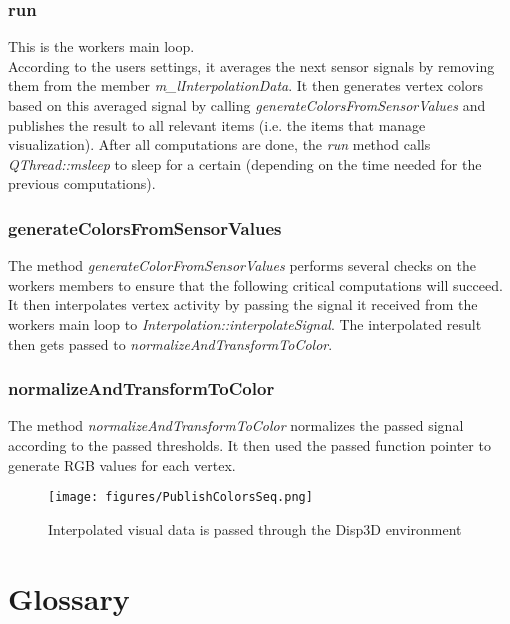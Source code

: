 \subsubsection{run}

This is the workers main loop.\\
According to the users settings, it averages the next sensor signals by removing them from the member \textit{m\_lInterpolationData}. It then generates vertex colors based on this averaged signal by calling \textit{generateColorsFromSensorValues} and publishes the result to all relevant items (i.e. the items that manage visualization). After all computations are done, the \textit{run} method calls \textit{QThread::msleep} to sleep for a certain (depending on the time needed for the previous computations).

\subsubsection{generateColorsFromSensorValues}

The method \textit{generateColorFromSensorValues} performs several checks on the workers members to ensure that the following critical computations will succeed. It then interpolates vertex activity by passing the signal it received from the workers main loop to \textit{Interpolation::interpolateSignal}. The interpolated result then gets passed to \textit{normalizeAndTransformToColor}.

\subsubsection{normalizeAndTransformToColor}

The method \textit{normalizeAndTransformToColor} normalizes the passed signal according to the passed thresholds. It then used the passed function pointer to generate RGB values for each vertex.

\begin{figure}[h]
	\begin{center}
		\texttt{[image: figures/PublishColorsSeq.png]}
		\caption{Interpolated visual data is passed through the Disp3D environment}
	\end{center}
\end{figure}

\clearpage

\section{Glossary}

